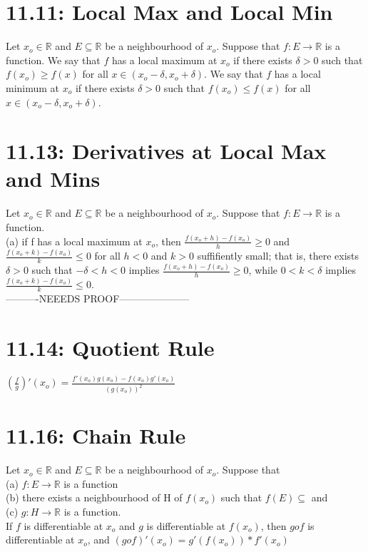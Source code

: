 \documentclass[10pt,letter]{report}
\begin{document}
\section*{11.11: Local Max and Local Min}
Let $x_o\in\mathbb{R}$ and $E\subseteq\mathbb{R}$ be a neighbourhood of $x_o$. Suppose that $f:E\rightarrow\mathbb{R}$ is a function. We say that $f$ has a local maximum at $x_o$ if there exists $\delta>0$ such that $f(x_o)\geq f(x)$ for all $x\in(x_o-\delta, x_o+\delta)$. We say that $f$ has a local minimum at $x_o$ if there exists $\delta>0$ such that $f(x_o)\leq f(x)$ for all $x\in(x_o-\delta,x_o+\delta)$. 

\section*{11.13: Derivatives at Local Max and Mins}
Let $x_o\in\mathbb{R}$ and $E\subseteq\mathbb{R}$ be a neighbourhood of $x_o$. Suppose that $f:E\rightarrow\mathbb{R}$ is a function. \\ 
(a) if f has a local maximum at $x_o$, then $\frac{f(x_o+h)-f(x_o)}{h}\geq0$ and $\frac{f(x_o+k)-f(x_o)}{k}\leq0$ for all $h<0$ and $k>0$ suffifiently small; that is, there exists $\delta>0$ such that $-\delta<h<0$ implies $\frac{f(x_o+h)-f(x_o)}{h}\geq0$, while $0<k<\delta$ implies $\frac{f(x_o+k)-f(x_o)}{k}\leq0$. \\ 
----------NEEEDS PROOF---------------------

\section*{11.14: Quotient Rule}
$(\frac{f}{g})'(x_o)=\frac{f'(x_o)g(x_o)-f(x_o)g'(x_o)}{(g(x_o))^2}$

\section*{11.16: Chain Rule}
Let $x_o\in\mathbb{R}$ and $E\subseteq\mathbb{R}$ be a neighbourhood of $x_o$. Suppose that \\ 
(a) $f:E\rightarrow\mathbb{R}$ is a function \\ 
(b) there exists a neighbourhood of H of $f(x_o)$ such that $f(E)\subseteq$ and \\ 
(c) $g:H\rightarrow\mathbb{R}$ is a function. \\ 
If $f$ is differentiable at $x_o$ and $g$ is differentiable at $f(x_o)$, then $gof$ is differentiable at $x_o$, and $(gof)'(x_o)=g'(f(x_o))*f'(x_o)$
\end{document}
